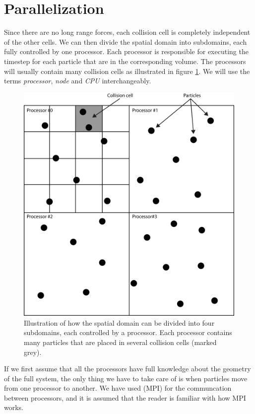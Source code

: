 \section{Parallelization}
\label{sec:dmsc_parallelization}
Since there are no long range forces, each collision cell is completely independent of the other cells. We can then divide the spatial domain into subdomains, each fully controlled by one processor. Each processor is responsible for executing the timestep for each particle that are in the corresponding volume. The processors will usually contain many collision cells as illustrated in figure \ref{fig:dsmc_parallelization_1}. We will use the terms \textit{processor}, \textit{node} and \textit{CPU} interchangeably.
\begin{figure}[h]
\begin{center}
\includegraphics[width=\textwidth, trim=0cm 0cm 0cm 0cm, clip]{DSMC/figures/parallelization.eps}
\end{center}
\caption{Illustration of how the spatial domain can be divided into four subdomains, each controlled by a processor. Each processor contains many particles that are placed in several collision cells (marked grey).}
\label{fig:dsmc_parallelization_1}
\end{figure}
If we first assume that all the processors have full knowledge about the geometry of the full system, the only thing we have to take care of is when particles move from one processor to another. We have used (MPI) for the communcation between processors, and it is assumed that the reader is familiar with how MPI works. 
